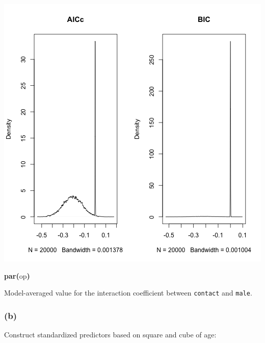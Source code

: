 \documentclass{article}
\makeatletter
\newcommand{\hlfunctioncall}[1]{\textcolor[rgb]{.5,0,.33}{\textbf{#1}}}%
\newcommand{\hlkeyword}[1]{\textbf{#1}}%
\newcommand{\hlsymbol}[1]{#1}%
\newenvironment{kframe}{%
 \def\FrameCommand##1{\hskip\@totalleftmargin \hskip-\fboxsep
 \colorbox{shadecolor}{##1}\hskip-\fboxsep
     \hskip-\linewidth \hskip-\@totalleftmargin \hskip\columnwidth}%
 \MakeFramed {\advance\hsize-\width
   \@totalleftmargin\z@ \linewidth\hsize
   \@setminipage}}%
 {\par\unskip\endMakeFramed}
\newenvironment{knitrout}{}{} %
\makeatother
\begin{document}
\begin{knitrout}
{\begin{kframe}
\includegraphics{interact-coef} \begin{flushleft}
\ttfamily\noindent
\hlfunctioncall{par}\hlkeyword{(}\hlsymbol{op}\hlkeyword{)}\mbox{}
\normalfont
\end{flushleft}
\end{kframe}}
\end{knitrout}

Model-averaged value for the interaction coefficient between {\tt contact} and {\tt male}. 


\subsubsection*{(b)}


Construct standardized predictors based on square and cube of age: 
\end{document}
